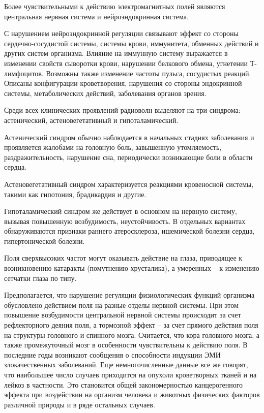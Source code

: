 Более чувствительными к действию электромагнитных полей являются центральная нервная система и нейроэндокринная система.

С нарушением нейроэндокринной регуляции связывают эффект со стороны сердечно-сосудистой 
системы, системы крови, иммунитета, обменных действий и других систем организма. 
Влияние на иммунную систему выражается в изменении свойств сыворотки крови, нарушении 
белкового обмена, угнетении Т-лимфоцитов. Возможны также изменение частоты пульса, 
сосудистых реакций. 
Описаны конфигурации кроветворения, нарушения со стороны эндокринной системы, 
метаболических действий, заболевания органов зрения. 

Среди всех клинических проявлений радиоволн выделяют на три синдрома: астенический, 
астеновегетативный и гипоталамический.

Астенический синдром обычно наблюдается в начальных стадиях заболевания и проявляется 
жалобами на головную боль, завышенную утомляемость, раздражительность, нарушение сна, 
периодически возникающие боли в области сердца.

Астеновегетативный  синдром характеризуется реакциями кровеносной системы, такими как 
гипотония, брадикардия и другие.

Гипоталамический синдром же действует в основном на нервную систему, вызывая повышенную 
возбудимость, неустойчивость. В отдельных вариантах обнаруживаются признаки раннего 
атеросклероза, ишемической болезни сердца, гипертонической болезни.

Поля сверхвысоких частот могут оказывать действие на глаза, приводящее к возникновению 
катаракты (помутнению хрусталика), а умеренных -- к изменению сетчатки глаза по типу. 

Предполагается, что нарушение регуляции физиологических функций организма обусловлено 
действием поля на разные отделы нервной системы. При этом повышение возбудимости 
центральной нервной системы происходит за счет рефлекторного деяния поля, а тормозной 
эффект -- за счет прямого действия поля на структуры головного и спинного мозга. Считается, что 
кора головного мозга, а также промежуточный мозг в особенности чувствительны к действию поля. 
В последние годы возникают сообщения о способности индукции ЭМИ злокачественных 
заболеваний. Еще немногочисленные данные все же говорят, что наибольшее число случаев 
приходится на опухоли кроветворных тканей и на лейкоз в частности. Это становится общей 
закономерностью канцерогенного эффекта при воздействии на организм человека и животных 
физических факторов различной природы и в ряде остальных случаев.

